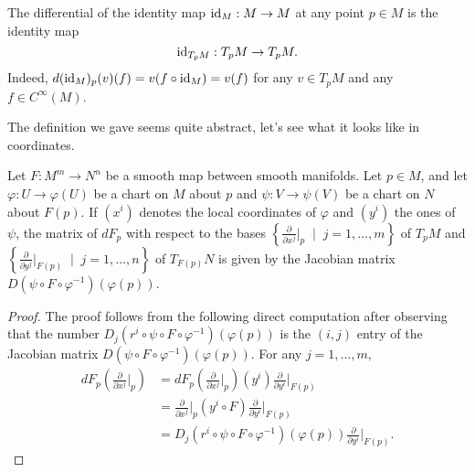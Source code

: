 \begin{remark}
  The differential of the identity map $\operatorname{id}_M:M\to M$ at any point $p\in M$ is the identity map
  \begin{equation}
    \operatorname{id}_{T_pM}: T_pM \to T_pM.
  \end{equation}
  Indeed, $d (\operatorname{id}_M)_p(v)(f) = v(f\circ\operatorname{id}_M) = v(f)$ for any $v\in T_pM$ and any $f\in C^\infty(M)$.
\end{remark}

The definition we gave seems quite abstract, let's see what it looks like in coordinates.

\begin{proposition}\label{prop:DiffCoords}
  Let $F:M^m\to N^n$ be a smooth map between smooth manifolds.
  Let $p\in M$, and let $\varphi : U \to \varphi(U)$ be a chart on $M$ about $p$ and $\psi: V \to \psi(V)$ be a chart on $N$ about $F(p)$.
  If $(x^i)$ denotes the local coordinates of $\varphi$ and $(y^i)$ the ones of $\psi$, the matrix of $dF_p$ with respect to the bases $\left\{\frac{\partial}{\partial x^j}\big|_p \;\mid\; j=1,\ldots,m\right\}$ of $T_pM$ and $\left\{\frac{\partial}{\partial y^j}\big|_{F(p)} \;\mid\; j=1,\ldots,n\right\}$ of $T_{F(p)}N$ is given by the Jacobian matrix $D(\psi\circ F \circ\varphi^{-1})(\varphi(p))$.
\end{proposition}
\begin{proof}
  The proof follows from the following direct computation after observing that the number $D_j(r^i \circ \psi \circ F \circ \varphi^{-1})(\varphi(p))$ is the $(i,j)$ entry of the Jacobian matrix $D(\psi\circ F \circ\varphi^{-1})(\varphi(p))$. For any $j=1,\ldots,m$,
  \begin{align}
    dF_p \left(\frac{\partial}{\partial x^j}\Big|_p\right)
    &= %
      dF_p \left(\frac{\partial}{\partial x^j}\Big|_p\right) (y^i) \frac{\partial}{\partial y^i}\Big|_{F(p)} \\
    &= %
      \frac{\partial}{\partial x^j}\Big|_p (y^i \circ F) \frac{\partial}{\partial y^i}\Big|_{F(p)} \\
    &=%
      D_j(r^i \circ \psi \circ F \circ \varphi^{-1})(\varphi(p)) \frac{\partial}{\partial y^i}\Big|_{F(p)}.
  \end{align}
\end{proof}

